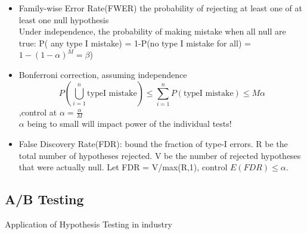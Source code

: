 \documentclass[11pt, openany]{book}              %
\begin{document}
\begin{itemize}
    \item Family-wise Error Rate(FWER) the probability of rejecting at least one of at least one null hypothesis \\ 
    Under independence, the probability of making mistake when all null are true: P( any type I mistake) = 1-P(no type I mistake for all) = $1-(1-\alpha)^M=\beta$) \\
    \item Bonferroni correction, assuming independence 
    $$P(\bigcup_{i=1}^n \text{typeI mistake}) \leq \sum_{i=1}^n P(\text{typeI mistake}) \leq M\alpha$$,control at $\alpha=\frac{\alpha}{M}$ \\
    $\alpha$ being to small will impact power of the individual tests!
    \item False Discovery Rate(FDR): bound the fraction of type-I errors. R be the total number of hypotheses rejected. V be the number of rejected hypotheses that were actually null. Let FDR = V/max(R,1), control $E(FDR) \leq \alpha$.
\end{itemize}

\subsection{A/B Testing}

Application of Hypothesis Testing in industry
\end{document}
